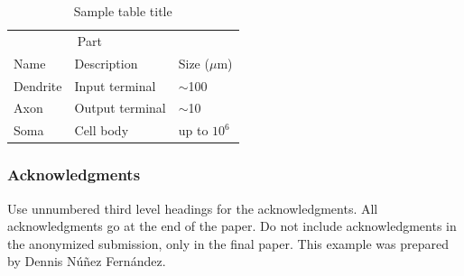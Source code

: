 \documentclass{article}
\begin{document}
\begin{table}[H]
  \caption{Sample table title}
  \label{sample-table}
  \centering
  \begin{tabular}{lll}
    \toprule
    \multicolumn{2}{c}{Part}                   \\
    \cmidrule(r){1-2}
    Name     & Description     & Size ($\mu$m) \\
    \midrule
    Dendrite & Input terminal  & $\sim$100     \\
    Axon     & Output terminal & $\sim$10      \\
    Soma     & Cell body       & up to $10^6$  \\
    \bottomrule
  \end{tabular}
\end{table}




\subsubsection*{Acknowledgments}

Use unnumbered third level headings for the acknowledgments. All acknowledgments go at the end of the paper. Do not include acknowledgments in the anonymized submission, only in the final paper. This example was prepared by Dennis Núñez Fernández.



{}

\end{document}
